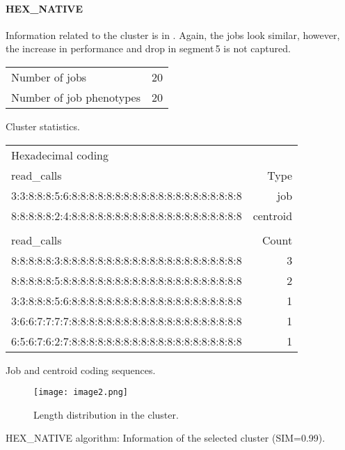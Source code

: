 \documentclass{jhps}
\begin{document}
\FloatBarrier
\paragraph{HEX\_NATIVE}
Information related to the cluster is in .
Again, the jobs look similar, however, the increase in performance and drop in segment\,5 is not captured.

\begin{cluster}
	\begin{subtable}{\textwidth}
		\centering
		\begin{tabular}{ll}
			Number of jobs & 20 \\
			Number of job phenotypes & 20 \\
		\end{tabular}
		\caption{Cluster statistics.}
		\label{cluster:use_case:hex_native:stats}
	\end{subtable}
	\medskip
	\begin{subtable}{\textwidth}
		\centering
		\begin{tiny}
			\begin{tabular}{l|r}
				\rowcolor{tblhead}
				Hexadecimal coding & \\
				\rowcolor{tblhead}
				read\_calls                                           & Type     \\
				\hline
				3:3:8:8:8:5:6:8:8:8:8:8:8:8:8:8:8:8:8:8:8:8:8:8:8:8:8 & job      \\
				8:8:8:8:8:2:4:8:8:8:8:8:8:8:8:8:8:8:8:8:8:8:8:8:8:8:8 & centroid \\
				\multicolumn{2}{l}{}\\
				\rowcolor{tblhead}
				read\_calls                                           & Count    \\
				\hline
				8:8:8:8:8:3:8:8:8:8:8:8:8:8:8:8:8:8:8:8:8:8:8:8:8:8:8 & 3        \\
				8:8:8:8:8:5:8:8:8:8:8:8:8:8:8:8:8:8:8:8:8:8:8:8:8:8:8 & 2        \\
				3:3:8:8:8:5:6:8:8:8:8:8:8:8:8:8:8:8:8:8:8:8:8:8:8:8:8 & 1        \\
				3:6:6:7:7:7:7:8:8:8:8:8:8:8:8:8:8:8:8:8:8:8:8:8:8:8:8 & 1        \\
				6:5:6:7:6:2:7:8:8:8:8:8:8:8:8:8:8:8:8:8:8:8:8:8:8:8:8 & 1        \\
			\end{tabular}
		\end{tiny}
		\caption{Job and centroid coding sequences.}
		\label{cluster:use_case:hex_native:job_centroid}
	\end{subtable}
	\medskip
	\begin{subfigure}{\textwidth}
		\centering
		\texttt{[image: image2.png]}
		\caption{Length distribution in the cluster.}
		\label{cluster:use_case:hex_native:length}
	\end{subfigure}
	\caption{HEX\_NATIVE algorithm: Information of the selected cluster (SIM=0.99).}
	\label{cluster:use_case:hex_native}
\end{cluster}
\end{document}
